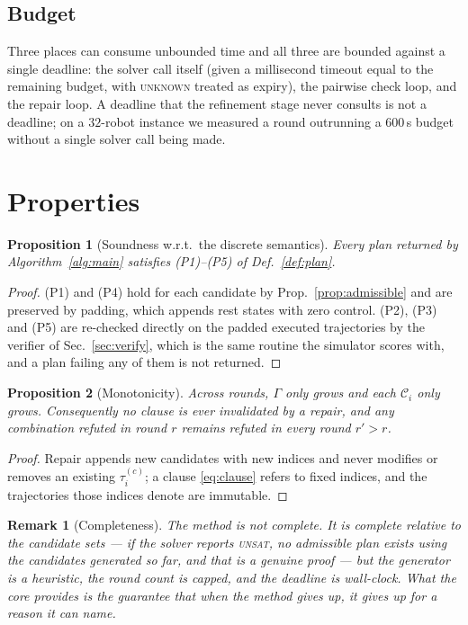 \documentclass[conference]{IEEEtran}
\newtheorem{proposition}{Proposition}
\newtheorem{remark}{Remark}
\newcommand{\Cand}{\mathcal{C}}
\begin{document}
\subsection{Budget}

Three places can consume unbounded time and all three are bounded against a single
deadline: the solver call itself (given a millisecond timeout equal to the remaining
budget, with \textsc{unknown} treated as expiry), the pairwise check loop, and the repair
loop. A deadline that the refinement stage never consults is not a deadline; on a
$32$-robot instance we measured a round outrunning a $600$\,s budget without a single
solver call being made.

\section{Properties}
\label{sec:properties}

\begin{proposition}[Soundness w.r.t.\ the discrete semantics]
\label{prop:sound}
Every plan returned by Algorithm~\ref{alg:main} satisfies (P1)--(P5) of
Def.~\ref{def:plan}.
\end{proposition}

\begin{proof}
(P1) and (P4) hold for each candidate by Prop.~\ref{prop:admissible} and are preserved by
padding, which appends rest states with zero control. (P2), (P3) and (P5) are re-checked
directly on the padded executed trajectories by the verifier of Sec.~\ref{sec:verify},
which is the same routine the simulator scores with, and a plan failing any of them is not
returned.
\end{proof}

\begin{proposition}[Monotonicity]
\label{prop:monotone}
Across rounds, $\Gamma$ only grows and each $\Cand_i$ only grows. Consequently no clause is
ever invalidated by a repair, and any combination refuted in round $r$ remains refuted in
every round $r' > r$.
\end{proposition}

\begin{proof}
Repair appends new candidates with new indices and never modifies or removes an existing
$\tau_i^{(c)}$; a clause \eqref{eq:clause} refers to fixed indices, and the trajectories
those indices denote are immutable.
\end{proof}

\begin{remark}[Completeness]
The method is \emph{not} complete. It is complete relative to the candidate sets --- if the
solver reports \textsc{unsat}, no admissible plan exists using the candidates generated so
far, and that is a genuine proof --- but the generator is a heuristic, the round count is
capped, and the deadline is wall-clock. What the core provides is the guarantee that when
the method gives up, it gives up for a reason it can name.
\end{remark}
\end{document}
